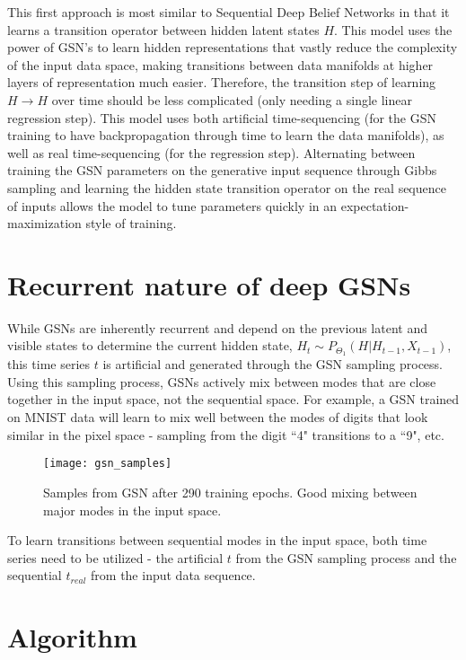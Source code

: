 This first approach is most similar to Sequential Deep Belief Networks in that it learns a transition operator between hidden latent states \(H\). This model uses the power of GSN's to learn hidden representations that vastly reduce the complexity of the input data space, making transitions between data manifolds at higher layers of representation much easier. Therefore, the transition step of learning \(H \rightarrow H\) over time should be less complicated (only needing a single linear regression step). This model uses both artificial time-sequencing (for the GSN training to have backpropagation through time to learn the data manifolds), as well as real time-sequencing (for the regression step). Alternating between training the GSN parameters on the generative input sequence through Gibbs sampling and learning the hidden state transition operator on the real sequence of inputs allows the model to tune parameters quickly in an expectation-maximization style of training.



\section{Recurrent nature of deep GSNs}

While GSNs are inherently recurrent and depend on the previous latent and visible states to determine the current hidden state, \(H_{t} \sim P_{\Theta_1}(H|H_{t-1},X_{t-1})\), this time series \(t\) is artificial and generated through the GSN sampling process. Using this sampling process, GSNs actively mix between modes that are close together in the input space, not the sequential space. For example, a GSN trained on MNIST data will learn to mix well between the modes of digits that look similar in the pixel space - sampling from the digit ``4" transitions to a ``9", etc.

\begin{figure}[h!]
  \centering
    \texttt{[image: gsn\_samples]}
\caption{Samples from GSN after 290 training epochs. Good mixing between major modes in the input space.}
\end{figure}

To learn transitions between sequential modes in the input space, both time series need to be utilized - the artificial \(t\) from the GSN sampling process and the sequential \(t_{real}\) from the input data sequence.


\section{Algorithm}

